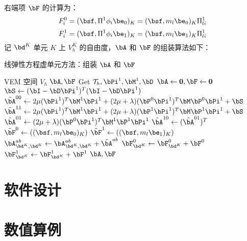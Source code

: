 右端项 $\bF$ 的计算为：
$$
F_{i}^{0} = (\bsf, \Pi^1\phi_i\be_0)_K = (\bsf, m_l\be_0)_K\Pi^1_{li}
$$
$$
F_{i}^{1} = (\bsf, \Pi^1\phi_i\be_1)_K = (\bsf, m_l\be_1)_K\Pi^1_{li}
$$
记 $\bd^K$ 单元 $K$ 上 $V_h^K$ 的自由度，$\bA$ 和 $\bF$ 的组装算法如下：
\begin{algorithm}[H]
    \caption{线弹性方程虚单元方法：组装 $\bA$ 和 $\bF$}\label{alg:assembleAF}
    \begin{algorithmic}[1]
    \Require VEM 空间 $V_h$
    \Ensure $\bA, \bF$
    \State Get $\mathcal{T}_h, \bPi^1, \bM^1, \bD$
    \State $\bA \gets \boldsymbol{0}, \bF \gets \boldsymbol{0}$
        \State $\bS \gets (\bI - \bD\bPi^1)^T(\bI - \bD\bPi^1)$
        \State $\tilde{\bA}^{00} \gets 2\mu(\bPi^1)^T\bM^1\bPi^1 +
            (2\mu + \lambda)(\bP^0\bPi^1)^T\bM\bP^{0}\bPi^1 + \bS$ 
        \State $\tilde{\bA}^{11} \gets 2\mu(\bPi^1)^T\bM^1\bPi^1 +
            (2\mu + \lambda)(\bP^1\bPi^1)^T\bM\bP^{1}\bPi^1 + \bS$ 
        \State $\tilde{\bA}^{01} \gets (2\mu+\lambda)(\bP^0\bPi^1)^T\bM^1\bP^{1}\bPi^1$
        \State $\tilde{\bA}^{10} \gets (\tilde{\bA}^{01})^T$ 
        \State $\tilde{\bF}^0 \gets ((\bsf, m_l\be_0)_K)$
        \State $\tilde{\bF}^1 \gets ((\bsf, m_l\be_1)_K)$
            \State $\bA^{ab}_{\bd^K, \bd^K} \gets \bA^{ab}_{\bd^K, \bd^K} + \tilde{\bA}^{ab}$
        \EndFor
        \State $\bF_{\bd^K}^0 \gets \bF_{\bd^K}^0 + \bF^0$
        \State $\bF_{\bd^K}^1 \gets \bF_{\bd^K}^1 + \bF^1$
    \EndFor
    \State \Return $\bA, \bF$
\end{algorithmic}
\end{algorithm}























 
\section{软件设计}

\section{数值算例}



















 

